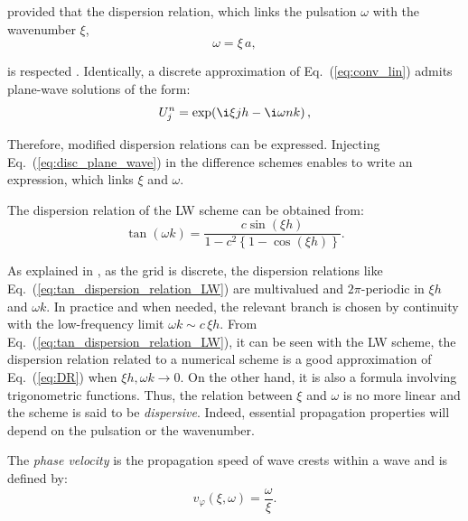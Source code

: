 \noindent provided that the dispersion relation, which links the pulsation $\omega$ with the wavenumber $\xi$, 
\begin{equation}
\label{eq:DR}
\omega = \xi \, a,
\end{equation}

\noindent is respected \cite{Lighthill:1978,Trefethen:1996}. Identically, a discrete approximation of Eq.~(\ref{eq:conv_lin}) admits plane-wave solutions of the form:
\begin{equation}
\label{eq:disc_plane_wave}
U_j^n = \exp(\i \xi j h - \i \omega n k) \, ,
\end{equation}

Therefore, modified dispersion relations can be expressed. Injecting Eq.~(\ref{eq:disc_plane_wave}) in the difference schemes enables to write an expression, which links $\xi$ and $\omega$.

\vskip8mm

\begin{example}
The dispersion relation of the LW scheme can be obtained from:
\begin{equation}
\label{eq:tan_dispersion_relation_LW}
\tan{(\omega k)} = \frac{c \sin{(\xi h)}}{1- c^2 \left\{1-\cos{(\xi h)}\right\}}.
\end{equation}
\end{example}

\vskip8mm

\noindent As explained in \cite{Trefethen:1982}, as the grid is discrete, the dispersion relations like Eq.~(\ref{eq:tan_dispersion_relation_LW}) are multivalued and $2\pi$-periodic in $\xi h$ and $\omega k$. In practice and when needed, the relevant branch is chosen by continuity with the low-frequency limit $\omega k \sim c\,\xi h$. 
From Eq.~(\ref{eq:tan_dispersion_relation_LW}), it can be seen with the LW scheme, the dispersion relation related to a numerical scheme is a good approximation of Eq.~(\ref{eq:DR}) when $\xi h,\omega k \rightarrow 0$. On the other hand, it is also a formula involving trigonometric functions. Thus, the relation between $\xi$ and $\omega$ is no more linear and the scheme is said to be \emph{dispersive}. Indeed, essential propagation properties will depend on the pulsation or the wavenumber. 

\noindent The \emph{phase velocity} is the propagation speed of wave crests within a wave and is defined by:
\begin{equation}
\label{eq:phase_vel}
v_{\varphi}(\xi,\omega) = \frac{\omega}{\xi}.
\end{equation}

